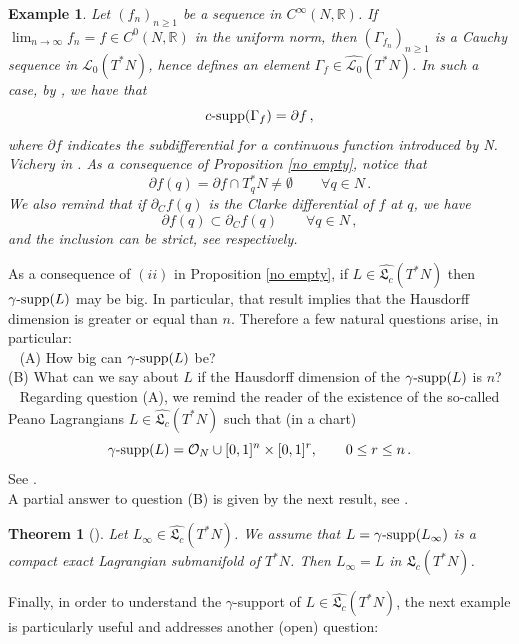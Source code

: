 \documentclass{article}
\newcommand{\1}{\mathbbm{1}}
\newtheorem{thm}{Theorem}[section]
\newtheorem{es}{Example}
\theoremstyle{remark}
\begin{document}
{{\begin{es} \textnormal{Let $(f_n)_{n \ge 1}$ be a sequence in $C^{\infty}(N,\mathbb{R})$. If $\lim_{n \to \infty} f_n = f \in C^0(N,\mathbb{R})$ in the uniform norm, then $(\Gamma_{f_n})_{n \ge 1}$ is a Cauchy sequence in $\mathscr{L}_0(T^*N)$, hence defines an element $\Gamma_f \in \widehat{\mathscr{L}_0}(T^*N)$. In such a case, by \cite[Proposition 9]{AGHIV23}, we have that 
$$c\textnormal{-supp}(\Gamma_f) = \partial f\, ,$$
where $\partial f$ indicates the subdifferential for a continuous function introduced by N. Vichery in \cite[Definition 3.4]{vic13}. As a consequence of Proposition \ref{no empty}, notice that 
$$\partial f(q) = \partial f \cap T^*_q N \ne \emptyset \qquad \forall q \in N\, .$$
We also remind that if $\partial_Cf(q)$ is the Clarke differential of $f$ at $q$, we have 
$$\partial f(q) \subset \partial_C f(q) \qquad \forall q \in N\, ,$$
and the inclusion can be strict, see \cite[Theorem 3.14 and Example 3.16]{vic13} respectively. 
}\end{es}
As a consequence of $(ii)$ in Proposition \ref{no empty}, if $L \in \widehat{\mathfrak{L}_c}(T^*N)$ then $\gamma\textnormal{-supp}(L)$ may be big. In particular, that result implies that the Hausdorff dimension is greater or equal than $n$. Therefore a few natural questions arise, in particular: \\
~\newline
(A) How big can $\gamma\textnormal{-supp}(L)$ be? \\
(B) What can we say about $L$ if the Hausdorff dimension of the $\gamma\textnormal{-supp}(L)$ is $n$? \\
~\newline
Regarding question (A), we remind the reader of the existence of the so-called Peano Lagrangians $L \in \widehat{\mathfrak{L}_c}(T^*N)$ such that (in a chart)
$$\gamma\textnormal{-supp}(L) = \mathcal{O}_N \cup [0,1]^n \times [0,1]^r, \qquad 0\le r \le n\, .$$
See \cite[Theorem 7.12]{vit22}.\\
A partial answer to question (B) is given by the next result, see \cite{AGIV24}.
\begin{thm}[\cite{AGIV24}]
Let $L_{\infty} \in \widehat{\mathfrak{L}_c}(T^*N)$. We assume that $L = \gamma\textnormal{-supp}(L_{\infty})$ is a compact exact Lagrangian submanifold of $T^*N$. Then $L_{\infty} = L$ in $\mathfrak{L}_c(T^*N)$.
\end{thm}
\noindent Finally, in order to understand the $\gamma$-support of $L \in \widehat{\mathfrak{L}_c}(T^*N)$, the next example is particularly useful and addresses another (open) question: \\
}}
\end{document}
